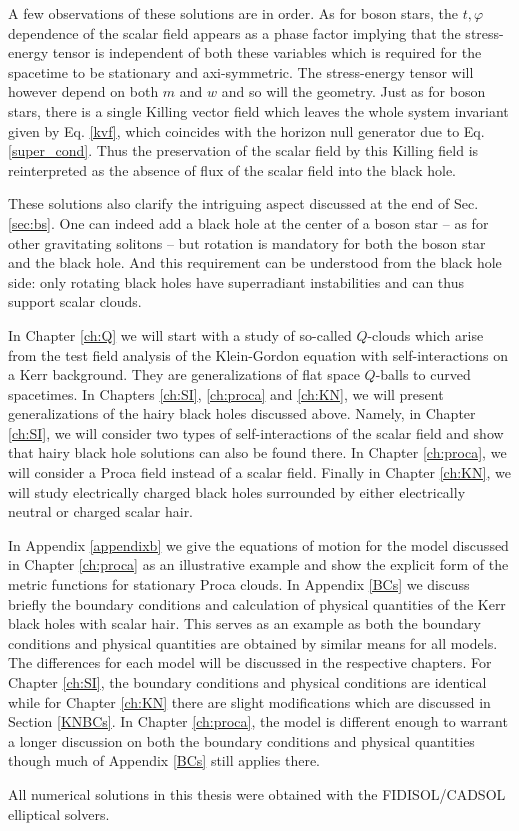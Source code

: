 A few observations of these solutions are in order.
As for boson stars, the $t,\varphi$ dependence of the scalar field appears as a phase factor implying that the stress-energy tensor is independent of both these variables which is required for the spacetime to be stationary and axi-symmetric.
The stress-energy tensor will however depend on both $m$ and $w$ and so will the geometry.
Just as for boson stars, there is a single Killing vector field which leaves the whole system invariant given by Eq. \eqref{kvf},
which coincides with the horizon null generator due to Eq. \eqref{super_cond}.
Thus the preservation of the scalar field by this Killing field is reinterpreted as the absence of flux of the scalar field into the black hole.

These solutions also clarify the intriguing aspect discussed at the end of Sec. \ref{sec:bs}.
One can indeed add a black hole at the center of a boson star -- as for other gravitating solitons -- but rotation is mandatory for both the boson star and the black hole.
And this requirement can be understood from the black hole side: only rotating black holes have superradiant instabilities and can thus support scalar clouds. 

In Chapter \ref{ch:Q} we will start with a study of so-called $Q$-clouds which arise from the test field analysis of the Klein-Gordon equation with self-interactions on a Kerr background.
They are generalizations of flat space $Q$-balls to curved spacetimes.
In Chapters \ref{ch:SI}, \ref{ch:proca} and \ref{ch:KN}, we will present generalizations of the hairy black holes discussed above.
Namely, in Chapter \ref{ch:SI}, we will consider two types of self-interactions of the scalar field and show that hairy black hole solutions can also be found there.
In Chapter \ref{ch:proca}, we will consider a Proca field instead of a scalar field.
Finally in Chapter \ref{ch:KN}, we will study electrically charged black holes surrounded by either electrically neutral or charged scalar hair.

In Appendix \ref{appendixb} we give the equations of motion for the model discussed in Chapter \ref{ch:proca} as an illustrative example and show the explicit form of the metric functions for stationary Proca clouds.
In Appendix \ref{BCs} we discuss briefly the boundary conditions and calculation of physical quantities of the Kerr black holes with scalar hair.
This serves as an example as both the boundary conditions and physical quantities are obtained by similar means for all models.
The differences for each model will be discussed in the respective chapters.
For Chapter \ref{ch:SI}, the boundary conditions and physical conditions are identical while for Chapter \ref{ch:KN} there are slight modifications which are discussed in Section \ref{KNBCs}.
In Chapter \ref{ch:proca}, the model is different enough to warrant a longer discussion on both the boundary conditions and physical quantities though much of Appendix \ref{BCs} still applies there.

All numerical solutions in this thesis were obtained with the FIDISOL/CADSOL elliptical solvers\cite{schoen}.


